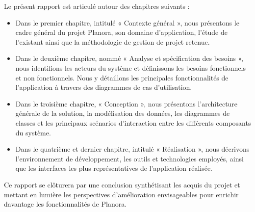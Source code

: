 Le présent rapport est articulé autour des chapitres suivants :
\begin{itemize}
  \item Dans le premier chapitre, intitulé « Contexte général », nous présentons le cadre général du projet Planora, son domaine d'application, l'étude de l'existant ainsi que la méthodologie de gestion de projet retenue.
  \item Dans le deuxième chapitre, nommé « Analyse et spécification des besoins », nous identifions les acteurs du système et définissons les besoins fonctionnels et non fonctionnels. Nous y détaillons les principales fonctionnalités de l'application à travers des diagrammes de cas d'utilisation.
  \item Dans le troisième chapitre, « Conception », nous présentons l'architecture générale de la solution, la modélisation des données, les diagrammes de classes et les principaux scénarios d'interaction entre les différents composants du système.
  \item Dans le quatrième et dernier chapitre, intitulé « Réalisation », nous décrivons l'environnement de développement, les outils et technologies employés, ainsi que les interfaces les plus représentatives de l'application réalisée.
\end{itemize}

Ce rapport se clôturera par une conclusion synthétisant les acquis du projet et mettant en lumière les perspectives d'amélioration envisageables pour enrichir davantage les fonctionnalités de Planora.